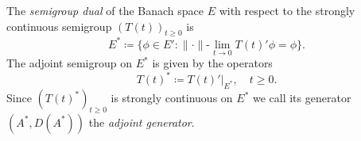 \begin{comment}
It follows from Thm.III.5.30 in \citeidx{kato:1966}{Kato} that the resolvent $R(\lambda,A')$ of $A'$ is $R(\lambda,A)'$.
In particular, the spectra $\sigma(A)$ and $\sigma(A')$ coincide.
But it is still necessary in some situations to have strong continuity for the adjoint semigroup.
In order to achieve this we restrict $T(t)'$ to an appropriate subspace of $E'$.

\end{comment}

\begin{definition}\label{def:a1-3.1}
The \emph{semigroup dual} of the Banach space $E$ with respect to the strongly continuous semigroup $(T(t))_{t \geq 0}$ is
\[
    E^{*} \coloneqq \{\phi \in E': \|\cdot\|\text{-}\lim_{t \to 0} T(t)'\phi = \phi\}.
\]
The adjoint semigroup on $E^{*}$ is given by the operators
\[
    T(t)^{*} \coloneqq T(t)'|_{E^{*}}, \quad t \geq 0.
\]
Since $(T(t)^{*})_{t \geq 0}$ is strongly continuous on $E^{*}$ we call its generator $(A^{*},D(A^{*}))$ the \emph{adjoint generator}.
\end{definition}


